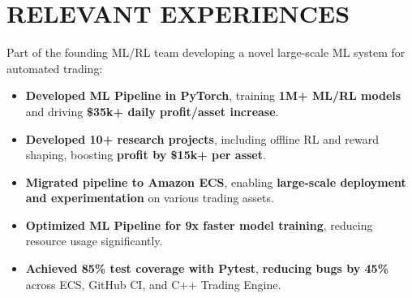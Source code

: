 \section{RELEVANT EXPERIENCES}

{
}
Part of the founding ML/RL team developing a novel large-scale ML system for automated trading:
\begin{itemize}
    \item \textbf{Developed ML Pipeline in PyTorch}, training \textbf{1M+ ML/RL models} and driving \textbf{\$35k+ daily profit/asset increase}. 
    \item \textbf{Developed 10+ research projects}, including offline RL and reward shaping, boosting \textbf{profit by \$15k+ per asset}.
    \item \textbf{Migrated pipeline to Amazon ECS}, enabling \textbf{large-scale deployment and experimentation} on various trading assets.
    \item \textbf{Optimized ML Pipeline for 9x faster model training}, reducing resource usage significantly.
    \item  \textbf{Achieved 85\% test coverage with Pytest}, \textbf{reducing bugs by 45\%} across ECS, GitHub CI, and C++ Trading Engine.
\end{itemize}

